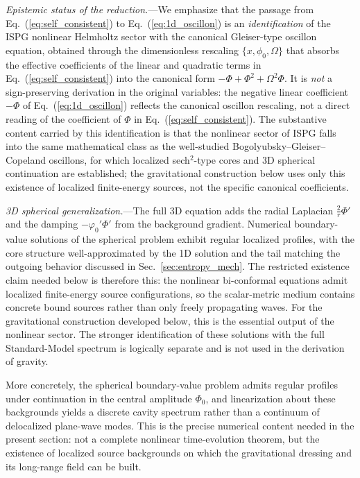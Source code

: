 \documentclass[aps,prd,onecolumn,superscriptaddress,nofootinbib,showpacs,12pt,notitlepage]{revtex4-2}
\begin{document}
\textit{Epistemic status of the reduction.}---We emphasize
that the passage from Eq.~(\ref{eq:self_consistent}) to
Eq.~(\ref{eq:1d_oscillon}) is an \emph{identification} of
the ISPG nonlinear Helmholtz sector with the canonical
Gleiser-type oscillon equation, obtained through the
dimensionless rescaling $\{x,\phi_0,\Omega\}$ that absorbs
the effective coefficients of the linear and quadratic terms
in Eq.~(\ref{eq:self_consistent}) into the canonical form
$-\Phi+\Phi^{2}+\Omega^{2}\Phi$.  It is \emph{not} a
sign-preserving derivation in the original variables: the
negative linear coefficient $-\Phi$ of
Eq.~(\ref{eq:1d_oscillon}) reflects the canonical oscillon
rescaling, not a direct reading of the coefficient of
$\Phi$ in Eq.~(\ref{eq:self_consistent}).  The substantive
content carried by this identification is that the
nonlinear sector of ISPG falls into the same mathematical
class as the well-studied Bogolyubsky--Gleiser--Copeland
oscillons, for which localized sech$^{2}$-type cores and
3D spherical continuation are established; the gravitational
construction below uses only this existence of localized
finite-energy sources, not the specific canonical
coefficients.

\textit{3D spherical generalization.}---The full 3D equation
adds the radial Laplacian $\frac{2}{r}\Phi'$ and the damping
$-\varphi_0'\Phi'$ from the background gradient.  Numerical
boundary-value solutions of the spherical problem exhibit
regular localized profiles, with the core structure
well-approximated by the 1D solution and the tail matching
the outgoing behavior discussed in
Sec.~\ref{sec:entropy_mech}.  The restricted existence claim
needed below is therefore this: the nonlinear bi-conformal
equations admit localized finite-energy source configurations,
so the scalar-metric medium contains concrete bound sources
rather than only freely propagating waves.  For the
gravitational construction developed below, this is the
essential output of the nonlinear sector.  The stronger
identification of these solutions with the full
Standard-Model spectrum is logically separate and is not used
in the derivation of gravity.

More concretely, the spherical boundary-value problem admits
regular profiles under continuation in the central amplitude
$\Phi_0$, and linearization about these backgrounds yields a
discrete cavity spectrum rather than a continuum of delocalized
plane-wave modes.  This is the precise numerical content needed
in the present section: not a complete nonlinear time-evolution
theorem, but the existence of localized source backgrounds on
which the gravitational dressing and its long-range field can be
built.
\end{document}
